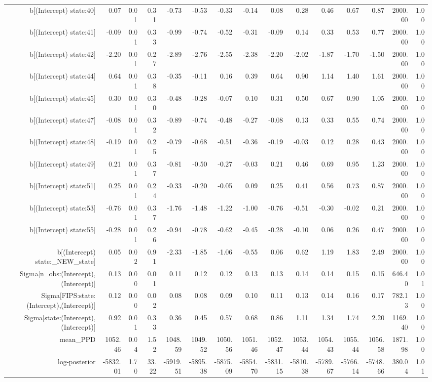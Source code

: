 \begin{table}[ht]
\begin{tabular}{rrrrrrrrrrrrrrr}
  b[(Intercept) state:40] & 0.07 & 0.01 & 0.31 & -0.73 & -0.53 & -0.33 & -0.14 & 0.08 & 0.28 & 0.46 & 0.67 & 0.87 & 2000.00 & 1.00 \\ 
  b[(Intercept) state:41] & -0.09 & 0.01 & 0.33 & -0.99 & -0.74 & -0.52 & -0.31 & -0.09 & 0.14 & 0.33 & 0.53 & 0.77 & 2000.00 & 1.00 \\ 
  b[(Intercept) state:42] & -2.20 & 0.01 & 0.27 & -2.89 & -2.76 & -2.55 & -2.38 & -2.20 & -2.02 & -1.87 & -1.70 & -1.50 & 2000.00 & 1.00 \\ 
  b[(Intercept) state:44] & 0.64 & 0.01 & 0.38 & -0.35 & -0.11 & 0.16 & 0.39 & 0.64 & 0.90 & 1.14 & 1.40 & 1.61 & 2000.00 & 1.00 \\ 
  b[(Intercept) state:45] & 0.30 & 0.01 & 0.30 & -0.48 & -0.28 & -0.07 & 0.10 & 0.31 & 0.50 & 0.67 & 0.90 & 1.05 & 2000.00 & 1.00 \\ 
  b[(Intercept) state:47] & -0.08 & 0.01 & 0.32 & -0.89 & -0.74 & -0.48 & -0.27 & -0.08 & 0.13 & 0.33 & 0.55 & 0.74 & 2000.00 & 1.00 \\ 
  b[(Intercept) state:48] & -0.19 & 0.01 & 0.25 & -0.79 & -0.68 & -0.51 & -0.36 & -0.19 & -0.03 & 0.12 & 0.28 & 0.43 & 2000.00 & 1.00 \\ 
  b[(Intercept) state:49] & 0.21 & 0.01 & 0.37 & -0.81 & -0.50 & -0.27 & -0.03 & 0.21 & 0.46 & 0.69 & 0.95 & 1.23 & 2000.00 & 1.00 \\ 
  b[(Intercept) state:51] & 0.25 & 0.01 & 0.24 & -0.33 & -0.20 & -0.05 & 0.09 & 0.25 & 0.41 & 0.56 & 0.73 & 0.87 & 2000.00 & 1.00 \\ 
  b[(Intercept) state:53] & -0.76 & 0.01 & 0.37 & -1.76 & -1.48 & -1.22 & -1.00 & -0.76 & -0.51 & -0.30 & -0.02 & 0.21 & 2000.00 & 1.00 \\ 
  b[(Intercept) state:55] & -0.28 & 0.01 & 0.26 & -0.94 & -0.78 & -0.62 & -0.45 & -0.28 & -0.10 & 0.06 & 0.26 & 0.47 & 2000.00 & 1.00 \\ 
  b[(Intercept) state:\_NEW\_state] & 0.05 & 0.02 & 0.91 & -2.33 & -1.85 & -1.06 & -0.55 & 0.06 & 0.62 & 1.19 & 1.83 & 2.49 & 2000.00 & 1.00 \\ 
  Sigma[n\_obs:(Intercept),(Intercept)] & 0.13 & 0.00 & 0.01 & 0.11 & 0.12 & 0.12 & 0.13 & 0.13 & 0.14 & 0.14 & 0.15 & 0.15 & 646.40 & 1.01 \\ 
  Sigma[FIPS:state:(Intercept),(Intercept)] & 0.12 & 0.00 & 0.02 & 0.08 & 0.08 & 0.09 & 0.10 & 0.11 & 0.13 & 0.14 & 0.16 & 0.17 & 782.13 & 1.00 \\ 
  Sigma[state:(Intercept),(Intercept)] & 0.92 & 0.01 & 0.33 & 0.36 & 0.45 & 0.57 & 0.68 & 0.86 & 1.11 & 1.34 & 1.74 & 2.20 & 1169.40 & 1.00 \\ 
  mean\_PPD & 1052.46 & 0.04 & 1.52 & 1048.59 & 1049.52 & 1050.56 & 1051.46 & 1052.47 & 1053.44 & 1054.43 & 1055.44 & 1056.58 & 1871.98 & 1.00 \\ 
  log-posterior & -5832.01 & 1.70 & 33.22 & -5919.51 & -5895.38 & -5875.09 & -5854.70 & -5831.15 & -5810.38 & -5789.67 & -5766.14 & -5748.66 & 380.04 & 1.01 \\ 
   \hline
\end{tabular}
\end{table}
